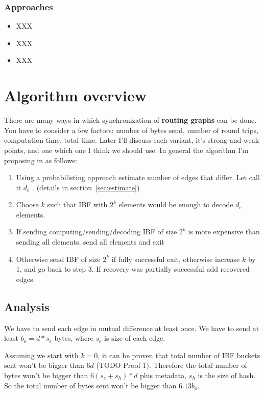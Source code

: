 \documentclass[11pt]{article}
\begin{document}
\subsubsection{Approaches}
\begin{itemize}
\item XXX
\item XXX
\item XXX
\end{itemize}



\section{Algorithm overview}
There are many ways in which synchronization of \textbf{routing graphs} can be done.
You have to consider a few factors: number of bytes send, number of round trips, computation time, total time.
Later I'll discuss each variant, it's strong and weak points, and one which one I think we should use.
In general the algorithm I'm proposing in as follows:
\begin{enumerate}
  \item Using a probabilisting approach estimate number of edges that differ. Let call it $d_e$ . (details in section~\ref{sec:estimate})
  \item Choose $k$ such that IBF with $2^k$ elements would be enough to decode $d_e$ elements.
  \item If sending computing/sending/decoding IBF of size $2^k$ is more expensive than sending all elements, send all elements and exit
  \item Otherwise send IBF of size $2^k$ if fully successful exit, otherwise increase $k$ by 1, and go back to step 3.
 If recovery was partially successful add recovered edges.
\end{enumerate}
\subsection{Analysis}
We have to send each edge in mutual difference at least once.
We have to send at least $b_o = d*s_e$ bytes, where $s_e$ is size of each edge.

Assuming we start with $k=0$, it can be proven that total number of IBF buckets sent won't be bigger than $6d$  (TODO Proof 1).
Therefore the total number of bytes won't be bigger than $6(s_e+s_h)*d$ plus metadata, $s_h$ is the size of hash.
So the total number of bytes sent won't be bigger than $6.13b_o$.
\end{document}
